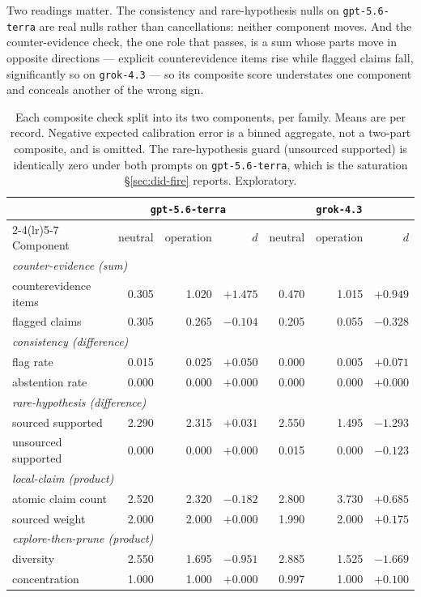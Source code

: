 Two readings matter. The consistency and rare-hypothesis nulls on \texttt{gpt-5.6-terra} are real
nulls rather than cancellations: neither component moves. And the counter-evidence check, the one
role that passes, is a sum whose parts move in opposite directions --- explicit counterevidence items
rise while flagged claims fall, significantly so on \texttt{grok-4.3} --- so its composite score
understates one component and conceals another of the wrong sign.

\begin{table}[h]
\centering
\small
\begin{tabular}{lrrrrrr}
\toprule
 & \multicolumn{3}{c}{\texttt{gpt-5.6-terra}} & \multicolumn{3}{c}{\texttt{grok-4.3}} \\
\cmidrule(lr){2-4}\cmidrule(lr){5-7}
Component & neutral & operation & $d$ & neutral & operation & $d$ \\
\midrule
\multicolumn{7}{l}{\emph{counter-evidence (sum)}} \\
\quad counterevidence items & 0.305 & 1.020 & $+1.475$ & 0.470 & 1.015 & $+0.949$ \\
\quad flagged claims        & 0.305 & 0.265 & $-0.104$ & 0.205 & 0.055 & $-0.328$ \\
\multicolumn{7}{l}{\emph{consistency (difference)}} \\
\quad flag rate             & 0.015 & 0.025 & $+0.050$ & 0.000 & 0.005 & $+0.071$ \\
\quad abstention rate       & 0.000 & 0.000 & $+0.000$ & 0.000 & 0.000 & $+0.000$ \\
\multicolumn{7}{l}{\emph{rare-hypothesis (difference)}} \\
\quad sourced supported     & 2.290 & 2.315 & $+0.031$ & 2.550 & 1.495 & $-1.293$ \\
\quad unsourced supported   & 0.000 & 0.000 & $+0.000$ & 0.015 & 0.000 & $-0.123$ \\
\multicolumn{7}{l}{\emph{local-claim (product)}} \\
\quad atomic claim count    & 2.520 & 2.320 & $-0.182$ & 2.800 & 3.730 & $+0.685$ \\
\quad sourced weight        & 2.000 & 2.000 & $+0.000$ & 1.990 & 2.000 & $+0.175$ \\
\multicolumn{7}{l}{\emph{explore-then-prune (product)}} \\
\quad diversity             & 2.550 & 1.695 & $-0.951$ & 2.885 & 1.525 & $-1.669$ \\
\quad concentration         & 1.000 & 1.000 & $+0.000$ & 0.997 & 1.000 & $+0.100$ \\
\bottomrule
\end{tabular}
\caption{Each composite check split into its two components, per family. Means are per record.
Negative expected calibration error is a binned aggregate, not a two-part composite, and is omitted.
The rare-hypothesis guard (unsourced supported) is identically zero under both prompts on
\texttt{gpt-5.6-terra}, which is the saturation \S\ref{sec:did-fire} reports. Exploratory.}
\label{tab:components}
\end{table}

